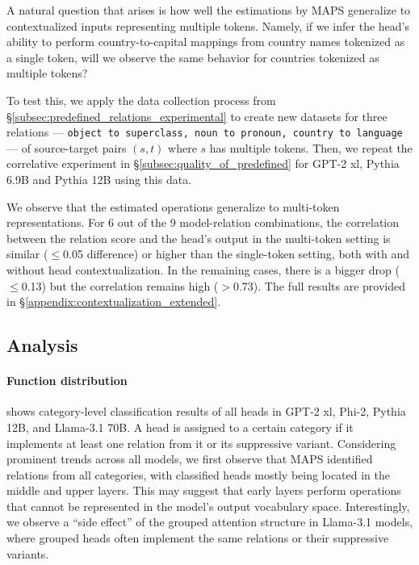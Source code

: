 \documentclass[11pt]{article}
\newcommand{\llamaThreeSeventyB}{Llama-3.1 70B}
\newcommand{\llama}{Llama-3.1}
\newcommand{\PHI}{Phi-2}
\newcommand{\PythiaTwelveB}{Pythia 12B}
\newcommand{\PythiaSevenB}{Pythia 6.9B}
\newcommand{\GPTxl}{GPT-2 xl}
\newcommand{\framework}{\textsc{MAPS}}
\begin{document}
A natural question that arises is how well the estimations by \framework{} generalize to contextualized inputs representing multiple tokens. Namely, if we infer the head's ability to perform country-to-capital mappings from country names tokenized as a single token, will we observe the same behavior for countries tokenized as multiple tokens? 

To test this, we apply the data collection process from \S\ref{subsec:predefined_relations_experimental} to create new datasets for three relations --- \texttt{object to superclass, noun to pronoun, country to language} --- of source-target pairs $(s,t)$ where $s$ has multiple tokens. 
Then, we repeat the correlative experiment in \S\ref{subsec:quality_of_predefined} 
 for \GPTxl{}, \PythiaSevenB{} and \PythiaTwelveB{} using this data.



We observe that the estimated operations generalize to multi-token representations. For 6 out of the 9 model-relation combinations, the correlation between the relation score and the head's output in the multi-token setting is similar ($\leq$0.05 difference) or higher than the single-token setting, both with and without head contextualization. In the remaining cases, there is a bigger drop ($\leq$0.13) but the correlation remains high ($>$0.73).
The full results are provided in \S\ref{appendix:contextualization_extended}.


\subsection{Analysis}
\label{subsec:predefined_relations_results}

\paragraph{Function distribution}
 shows category-level classification results of all heads in \GPTxl{}, \PHI{}, \PythiaTwelveB{}, and \llamaThreeSeventyB{}. A head is assigned to a certain category if it implements at least one relation from it or its suppressive variant.
Considering prominent trends across all models, we first observe that \framework{} identified relations from all categories, with classified heads mostly being located in the middle and upper layers. This may suggest that early layers perform operations that cannot be represented in the model's output vocabulary space. 
Interestingly, we observe a ``side effect'' of the grouped attention structure in \llama{} models, where grouped heads often implement the same relations or their suppressive variants.
\end{document}
